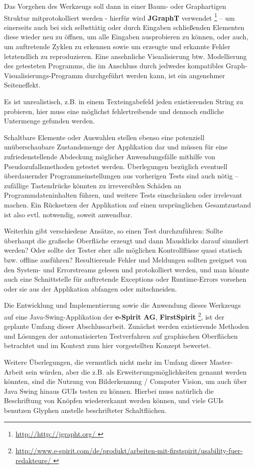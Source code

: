 Das Vorgehen des Werkzeugs soll dann in einer Baum- oder Graphartigen
Struktur mitprotokolliert werden - hierfür wird \textbf{JGraphT} verwendet \footnote{\url{ http://http://jgrapht.org/ }} --
um einerseits auch bei sich selbsttätig oder durch Eingaben schließenden Elementen diese wieder
neu zu öffnen, um alle Eingaben ausprobieren zu können, oder auch, um auftretende Zyklen 
zu erkennen sowie um erzeugte und erkannte Fehler letztendlich zu reproduzieren.
Eine ansehnliche Visualisierung btw. Modellierung des getesteten Programms, die
im Anschluss durch jedwedes kompatibles Graph-Visualisierungs-Programm
durchgeführt werden kann, ist ein angenehmer Seiteneffekt.

Es ist unrealistisch, z.B. in
einem Texteingabefeld jeden existierenden String zu probieren, hier muss eine möglichst
fehlertreibende und dennoch endliche Untermenge gefunden werden.

Schaltbare Elemente oder Auswahlen stellen ebenso
eine potenziell unüberschaubare Zustandsmenge der Applikation dar und müssen für eine
zufriedenstellende Abdeckung möglicher Anwendungsfälle mithilfe von
Pseudozufallsmethoden getestet werden. Überlegungen bezüglich eventuell überdauernder Programmeinstellungen
aus vorherigen Tests sind auch nötig -- zufällige Tastendrücke könnten zu irreversiblen Schäden an
Programmdateninhalten führen, und weitere Tests einschränken oder irrelevant machen. Ein Rücksetzen
der Applikation auf einen ursprünglichen Gesamtzustand ist also evtl. notwendig, soweit anwendbar.
 
Weiterhin gibt verschiedene Ansätze, so einen Test durchzuführen: Sollte überhaupt die
grafische Oberfläche erzeugt und dann Mausklicks darauf simuliert werden? Oder sollte der
Tester eher alle möglichen Kontrollflüsse quasi statisch bzw. offline ausführen? Resultierende
Fehler und Meldungen sollten geeignet von den System- und Errorstreams gelesen und
protokolliert werden, und man könnte auch eine Schnittstelle für auftretende Exceptions oder
Runtime-Errors vorsehen oder sie aus der Applikation abfangen oder mitschneiden. 
 
Die Entwicklung und Implementierung sowie die Anwendung dieses Werkzeugs auf eine Java-Swing-Applikation
der \textbf{e-Spirit AG}, \textbf{FirstSpirit} 
\footnote{\url{ http://www.e-spirit.com/de/produkt/arbeiten-mit-firstspirit/usability-fuer-redakteure/ }}, 
ist der geplante 
Umfang dieser Abschlussarbeit. Zunächst werden existierende Methoden und Lösungen der automatisierten
Testverfahren auf graphischen Oberflächen betrachtet und im Kontext zum hier vorgestellten Konzept
bewertet.
 
Weitere Überlegungen, die vermutlich nicht mehr im Umfang dieser Master-Arbeit sein
würden, aber die z.B. als Erweiterungsmöglichkeiten genannt werden könnten, sind die
Nutzung von Bilderkennung / Computer Vision, um auch über Java Swing hinaus GUIs testen zu
können. Hierbei muss natürlich die Beschriftung von Knöpfen wiedererkannt werden können,
und viele GUIs benutzen Glyphen anstelle beschrifteter Schaltflächen. 
